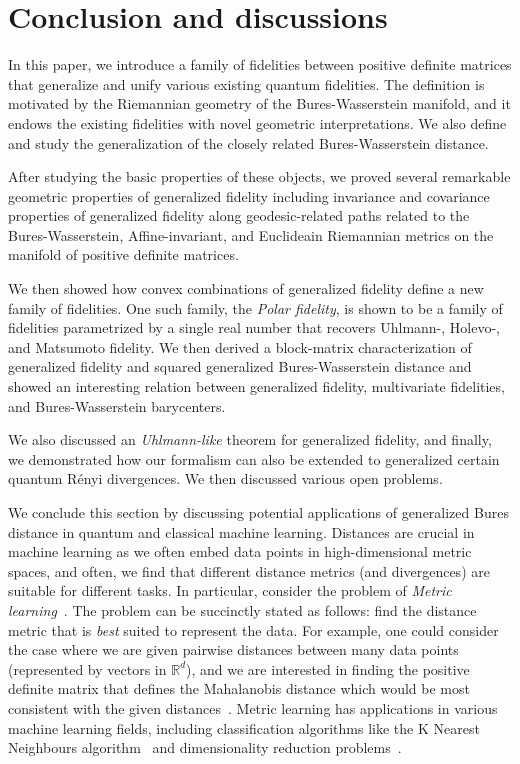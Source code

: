 \documentclass[12pt]{article}
\theoremstyle{definition}
\begin{document}
\section{Conclusion and discussions }\label{Sec:Concl}
In this paper, we introduce a family of fidelities between positive definite matrices that generalize and unify various existing quantum fidelities. The definition is motivated by the Riemannian geometry of the Bures-Wasserstein manifold, and it endows the existing fidelities with novel geometric interpretations. We also define and study the generalization of the closely related Bures-Wasserstein distance. 

After studying the basic properties of these objects, we proved several remarkable geometric properties of generalized fidelity including invariance and covariance properties of generalized fidelity along geodesic-related paths related to the Bures-Wasserstein, Affine-invariant, and Euclideain Riemannian metrics on the manifold of positive definite matrices. 

We then showed how convex combinations of generalized fidelity define a new family of fidelities. One such family, the \textit{Polar fidelity}, is shown to be a family of fidelities parametrized by a single real number that recovers Uhlmann-, Holevo-, and Matsumoto fidelity. We then derived a block-matrix characterization of generalized fidelity and squared generalized Bures-Wasserstein distance and showed an interesting relation between generalized fidelity, multivariate fidelities, and Bures-Wasserstein barycenters. 

We also discussed an \textit{Uhlmann-like} theorem for generalized fidelity, and finally, we demonstrated how our formalism can also be extended to generalized certain quantum R\'enyi divergences. We then discussed various open problems.

We conclude this section by discussing potential applications of generalized Bures distance in quantum and classical machine learning. Distances are crucial in machine learning as we often embed data points in high-dimensional metric spaces, and often, we find that different distance metrics (and divergences) are suitable for different tasks. In particular, consider the problem of \textit{Metric learning}~\cite{yang2006distance, zadeh2016geometric, kulis2013metric, davis2007information}. The problem can be succinctly stated as follows: find the distance metric that is \textit{best} suited to represent the data. For example, one could consider the case where we are given pairwise distances between many data points (represented by vectors in $\mathbb  R^d$), and we are interested in finding the positive definite matrix that defines the Mahalanobis distance which would be most consistent with the given distances~\cite{zadeh2016geometric}. Metric learning has applications in various machine learning fields, including classification algorithms like the K Nearest Neighbours algorithm~\cite{peterson2009k} and dimensionality reduction problems~\cite{wang2015survey, harandi2017joint}. 
\end{document}
